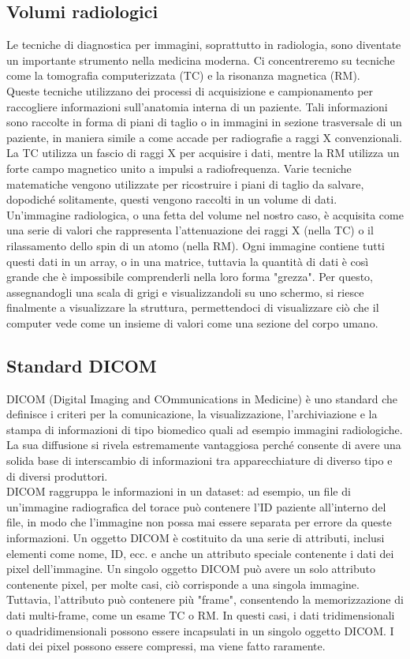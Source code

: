 \subsection{Volumi radiologici}\label{sec:volumi-radiologici}
Le tecniche di diagnostica per immagini, soprattutto in radiologia, sono diventate un importante strumento nella medicina moderna. Ci concentreremo su tecniche come la tomografia computerizzata (TC) e la risonanza magnetica (RM).
\\
Queste tecniche utilizzano dei processi di acquisizione e campionamento per raccogliere informazioni sull'anatomia interna di un paziente. Tali informazioni sono raccolte in forma di piani di taglio o in immagini in sezione trasversale di un paziente, in maniera simile a come accade per radiografie a raggi X convenzionali. La TC utilizza un fascio di raggi X per acquisire i dati, mentre la RM utilizza un forte campo magnetico unito a  impulsi a radiofrequenza. Varie tecniche matematiche vengono utilizzate per ricostruire i piani di taglio da salvare, dopodiché solitamente, questi vengono raccolti in un volume di dati.
\\
Un'immagine radiologica, o una fetta del volume nel nostro caso, è acquisita come una serie di valori che rappresenta l'attenuazione dei raggi X (nella TC) o il rilassamento dello spin di un atomo (nella RM). Ogni immagine contiene tutti questi dati in un array, o in una matrice, tuttavia la quantità di dati è così grande che è impossibile comprenderli nella loro forma "grezza". Per questo, assegnandogli una scala di grigi e visualizzandoli su uno schermo, si riesce finalmente a visualizzare la struttura, permettendoci di visualizzare ciò che il computer vede come un insieme di valori come una sezione del corpo umano.

\subsection{Standard DICOM}
DICOM (Digital Imaging and COmmunications in Medicine) è uno standard che definisce i criteri per la comunicazione, la visualizzazione, l'archiviazione e la stampa di informazioni di tipo biomedico quali ad esempio immagini radiologiche. La sua diffusione si rivela estremamente vantaggiosa perché consente di avere una solida base di interscambio di informazioni tra apparecchiature di diverso tipo e di diversi produttori.
\\
DICOM raggruppa le informazioni in un dataset: ad esempio, un file di un'immagine radiografica del torace può contenere l'ID paziente all'interno del file, in modo che l'immagine non possa mai essere separata per errore da queste informazioni. Un oggetto DICOM è costituito da una serie di attributi, inclusi elementi come nome, ID, ecc. e anche un attributo speciale contenente i dati dei pixel dell'immagine. Un singolo oggetto DICOM può avere un solo attributo contenente pixel, per molte casi, ciò corrisponde a una singola immagine. Tuttavia, l'attributo può contenere più "frame", consentendo la memorizzazione di dati multi-frame, come un esame TC o RM. In questi casi, i dati tridimensionali o quadridimensionali possono essere incapsulati in un singolo oggetto DICOM. I dati dei pixel possono essere compressi, ma viene fatto raramente.

